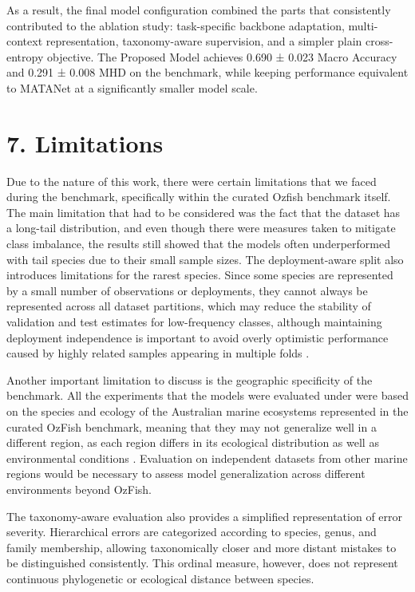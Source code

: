 \documentclass[preprint,12pt]{elsarticle}
\begin{document}
As a result, the final model configuration combined the parts that
consistently contributed to the ablation study: task-specific backbone
adaptation, multi-context representation, taxonomy-aware supervision,
and a simpler plain cross-entropy objective. The Proposed Model achieves
0.690 ± 0.023 Macro Accuracy and 0.291 ± 0.008 MHD on the benchmark,
while keeping performance equivalent to MATANet at a significantly
smaller model scale.

\section*{7. Limitations}\label{limitations}

Due to the nature of this work, there were certain limitations that we
faced during the benchmark, specifically within the curated Ozfish
benchmark itself. The main limitation that had to be considered was the
fact that the dataset has a long-tail distribution, and even though
there were measures taken to mitigate class imbalance, the results still
showed that the models often underperformed with tail species due to
their small sample sizes. The deployment-aware split also introduces
limitations for the rarest species. Since some species are represented
by a small number of observations or deployments, they cannot always be
represented across all dataset partitions, which may reduce the
stability of validation and test estimates for low-frequency classes,
although maintaining deployment independence is important to avoid
overly optimistic performance caused by highly related samples appearing
in multiple folds \cite{ref17}
\cite{ref20}.

Another important limitation to discuss is the geographic specificity of
the benchmark. All the experiments that the models were evaluated under
were based on the species and ecology of the Australian marine
ecosystems represented in the curated OzFish benchmark, meaning that
they may not generalize well in a different region, as each region
differs in its ecological distribution as well as environmental
conditions \cite{ref13}
\cite{ref18}. Evaluation on independent datasets
from other marine regions would be necessary to assess model
generalization across different environments beyond OzFish.

The taxonomy-aware evaluation also provides a simplified representation
of error severity. Hierarchical errors are categorized according to
species, genus, and family membership, allowing taxonomically closer and
more distant mistakes to be distinguished consistently. This ordinal
measure, however, does not represent continuous phylogenetic or
ecological distance between species.
\end{document}
